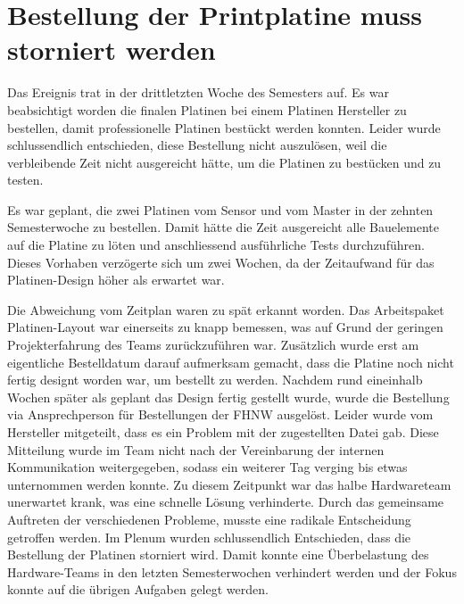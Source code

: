 \section{Bestellung der Printplatine muss storniert werden}
\label{sec:orderCancelled}

Das  Ereignis  trat  in  der  drittletzten Woche  des  Semesters  auf. Es  war
beabsichtigt  worden die  finalen Platinen  bei einem  Platinen Hersteller  zu
bestellen,  damit professionelle  Platinen  best\"uckt werden  konnten. Leider
wurde schlussendlich  entschieden, diese  Bestellung nicht  auszul\"osen, weil
die  verbleibende  Zeit   nicht  ausgereicht  h\"atte,  um   die  Platinen  zu
best\"ucken und zu testen.

Es  war  geplant,  die  zwei  Platinen  vom  Sensor  und  vom  Master  in  der
zehnten Semesterwoche  zu bestellen. Damit  h\"atte die Zeit  ausgereicht alle
Bauelemente auf die Platine zu  l\"oten und anschliessend ausf\"uhrliche Tests
durchzuf\"uhren. Dieses  Vorhaben verz\"ogerte  sich  um zwei  Wochen, da  der
Zeitaufwand f\"ur das Platinen-Design h\"oher als erwartet war.

Die Abweichung vom  Zeitplan waren zu sp\"at  erkannt worden. Das Arbeitspaket
Platinen-Layout war einerseits  zu knapp bemessen, was auf  Grund der geringen
Projekterfahrung  des Teams  zur\"uckzuf\"uhren  war. Zus\"atzlich wurde  erst
am  eigentliche  Bestelldatum  darauf  aufmerksam gemacht,  dass  die  Platine
noch  nicht  fertig  designt  worden   war,  um  bestellt  zu  werden. Nachdem
rund  eineinhalb  Wochen  sp\"ater  als geplant  das  Design  fertig  gestellt
wurde, wurde  die Bestellung  via Ansprechperson  f\"ur Bestellungen  der FHNW
ausgel\"ost. Leider wurde vom  Hersteller mitgeteilt, dass es  ein Problem mit
der  zugestellten Datei  gab. Diese Mitteilung  wurde im  Team nicht  nach der
Vereinbarung der internen Kommunikation weitergegeben, sodass ein weiterer Tag
verging bis etwas unternommen werden konnte. Zu diesem Zeitpunkt war das halbe
Hardwareteam unerwartet  krank, was eine schnelle  L\"osung verhinderte. Durch
das  gemeinsame Auftreten  der  verschiedenen Probleme,  musste eine  radikale
Entscheidung  getroffen werden. Im  Plenum wurden  schlussendlich Entschieden,
dass   die  Bestellung   der  Platinen   storniert  wird. Damit   konnte  eine
\"Uberbelastung des  Hardware-Teams in  den letzten  Semesterwochen verhindert
werden und der Fokus konnte auf die \"ubrigen Aufgaben gelegt werden.

